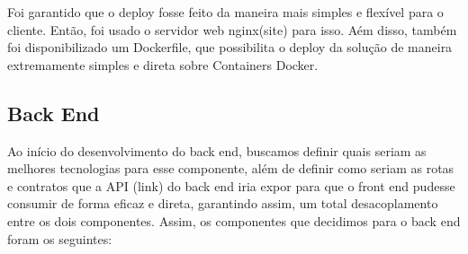 \documentclass[11pt,twoside]{article}
\begin{document}
Foi garantido que o deploy fosse feito da maneira mais simples e flexível para o cliente. Então, foi usado o servidor web nginx(site) para isso. Aém disso, também foi disponibilizado um Dockerfile, que possibilita
o deploy da solução de maneira extremamente simples e direta sobre Containers Docker.

\subsection{Back End}

Ao início do desenvolvimento do back end, buscamos definir quais seriam as melhores tecnologias para esse componente, além de definir como seriam as rotas e contratos que a API (link) do back end iria expor
para que o front end pudesse consumir de forma eficaz e direta, garantindo assim, um total desacoplamento entre os dois componentes. Assim, os componentes que decidimos para o back end foram os seguintes:
\end{document}
